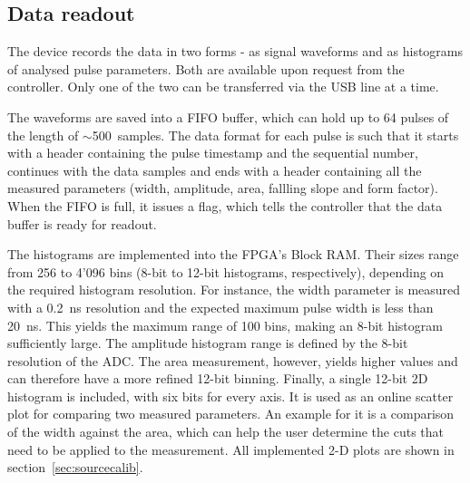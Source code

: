 \subsection{Data readout}
The device records the data in two forms - as signal waveforms and as histograms of analysed pulse parameters. Both are available upon request from the controller. Only one of the two can be transferred via the USB line at a time. 

The waveforms are saved into a FIFO buffer, which can hold up to 64 pulses of the length of $\sim$500~samples. The data format for each pulse is such that it starts with a header containing the pulse timestamp and the sequential number, continues with the data samples and ends with a header containing all the measured parameters (width, amplitude, area, fallling slope and form factor). When the FIFO is full, it issues a flag, which tells the controller that the data buffer is ready for readout. 

The histograms are implemented into the FPGA's Block RAM. Their sizes range from 256 to 4'096 bins (8-bit to 12-bit histograms, respectively), depending on the required histogram resolution. For instance, the width parameter is measured with a 0.2~ns resolution and the expected maximum pulse width is less than 20~ns. This yields the maximum range of 100 bins, making an 8-bit histogram sufficiently large. The amplitude histogram range is defined by the 8-bit resolution of the ADC. The area measurement, however, yields higher values and can therefore have a more refined 12-bit binning. Finally, a single 12-bit 2D histogram is included, with six bits for every axis. It is used as an online scatter plot for comparing two measured parameters. An example for it is a comparison of the width against the area, which can help the user determine the cuts that need to be applied to the measurement. All implemented 2-D plots are shown in section~\ref{sec:sourcecalib}.




























